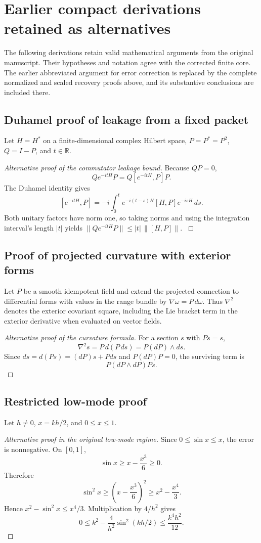 
\section{Earlier compact derivations retained as alternatives}\label{legacy:section:001}\label{legacy:alternatives}
The following derivations retain valid mathematical arguments from the original manuscript. Their hypotheses and notation agree with the corrected finite core. The earlier abbreviated argument for error correction is replaced by the complete normalized and scaled recovery proofs above, and its substantive conclusions are included there.
\subsection{Duhamel proof of leakage from a fixed packet}\label{legacy:duhamel}
Let $H=H^*$ on a finite-dimensional complex Hilbert space, $P=P^*=P^2$, $Q=I-P$, and $t\in\mathbb R$.
\begin{proof}[Alternative proof of the commutator leakage bound]\label{legacy:proof:001}
Because $QP=0$,
\[
Qe^{-itH}P=Q[e^{-itH},P]P.
\]
The Duhamel identity gives
\[
[e^{-itH},P]=-i\int_0^t e^{-i(t-s)H}[H,P]e^{-isH}\,ds.
\]
Both unitary factors have norm one, so taking norms and using the integration interval's length $|t|$ yields
$\|Qe^{-itH}P\|\le |t|\,\|[H,P]\|$.
\label{legacy:proof:001:end}\end{proof}
\subsection{Proof of projected curvature with exterior forms}\label{legacy:exterior}
Let $P$ be a smooth idempotent field and extend the projected connection to differential forms with values in the range bundle by $\nabla\omega=P\,d\omega$. Thus $\nabla^2$ denotes the exterior covariant square, including the Lie bracket term in the exterior derivative when evaluated on vector fields.
\begin{proof}[Alternative proof of the curvature formula]\label{legacy:proof:002}
For a section $s$ with $Ps=s$,
\[
\nabla^2s=P\,d(P\,ds)=P(dP)\wedge ds.
\]
Since $ds=d(Ps)=(dP)s+Pds$ and $P(dP)P=0$, the surviving term is
\[
P(dP\wedge dP)Ps.
\]
\label{legacy:proof:002:end}\end{proof}
\par{}
\subsection{Restricted low-mode proof}\label{legacy:lowmode}
Let $h\ne0$, $x=kh/2$, and $0\le x\le1$.
\begin{proof}[Alternative proof in the original low-mode regime]\label{legacy:proof:003}
Since $0\le\sin x\le x$, the error is nonnegative. On $[0,1]$,
\[
\sin x\ge x-\frac{x^3}{6}\ge0.
\]
Therefore
\[
\sin^2x\ge\left(x-\frac{x^3}{6}\right)^2\ge x^2-\frac{x^4}{3}.
\]
Hence $x^2-\sin^2x\le x^4/3$. Multiplication by $4/h^2$ gives
\[
0\le k^2-\frac4{h^2}\sin^2(kh/2)\le\frac{k^4h^2}{12}.
\]
\label{legacy:proof:003:end}\end{proof}
